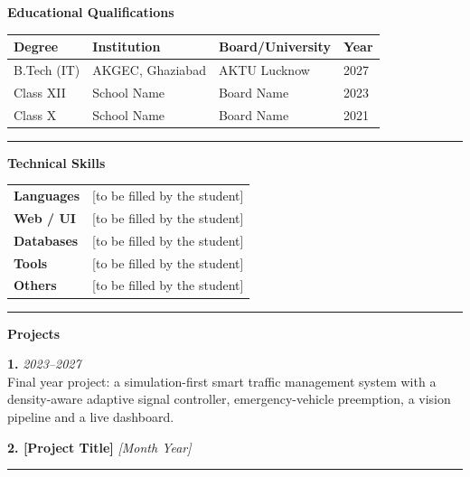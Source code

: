\noindent\textbf{Educational Qualifications}
\vspace{0.2cm}

\begin{tabular}{@{}p{2.5cm}p{5cm}p{3cm}p{1.5cm}@{}}
\toprule
\textbf{Degree} & \textbf{Institution} & \textbf{Board/University} & \textbf{Year} \\
\midrule
B.Tech (IT)    & AKGEC, Ghaziabad       & AKTU Lucknow & 2027 \\
Class XII       & School Name            & Board Name   & 2023 \\
Class X         & School Name            & Board Name   & 2021 \\
\bottomrule
\end{tabular}

\vspace{0.4cm}\hrule\vspace{0.4cm}

\noindent\textbf{Technical Skills}
\vspace{0.2cm}

\begin{tabular}{@{}p{3.5cm}p{9cm}@{}}
\textbf{Languages}   & [to be filled by the student] \\[3pt]
\textbf{Web / UI}    & [to be filled by the student] \\[3pt]
\textbf{Databases}   & [to be filled by the student] \\[3pt]
\textbf{Tools}       & [to be filled by the student] \\[3pt]
\textbf{Others}      & [to be filled by the student] \\
\end{tabular}

\vspace{0.4cm}\hrule\vspace{0.4cm}

\noindent\textbf{Projects}
\vspace{0.2cm}

\noindent\textbf{1. \reporttitle} \hfill \textit{2023--2027}\\
Final year project: a simulation-first smart traffic management system with a density-aware adaptive signal controller, emergency-vehicle preemption, a vision pipeline and a live dashboard.

\noindent\textbf{2. [Project Title]} \hfill \textit{[Month Year]}\\
[Brief one-line description of another project.]

\vspace{0.4cm}\hrule\vspace{0.4cm}

